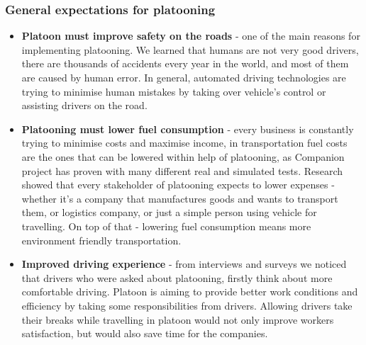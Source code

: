 \subsubsection{General expectations for platooning}
%
\begin{itemize}
    \item\textbf{Platoon must improve safety on the roads} - one of the main reasons for implementing platooning. We learned that humans are not very good drivers, there are thousands of accidents every year in the world, and most of them are caused by human error. In general, automated driving technologies are trying to minimise human mistakes by taking over vehicle's control or assisting drivers on the road.
    \item\textbf{Platooning must lower fuel consumption} - every business is constantly trying to minimise costs and maximise income, in transportation fuel costs are the ones that can be lowered within help of platooning, as Companion project has proven with many different real and simulated tests. Research showed that every stakeholder of platooning expects to lower expenses - whether it's a company that manufactures goods and wants to transport them, or logistics company, or just a simple person using vehicle for travelling. On top of that - lowering fuel consumption means more environment friendly transportation.
    \item\textbf{Improved driving experience} - from interviews and surveys we noticed that drivers who were asked about platooning, firstly think about more comfortable driving. Platoon is aiming to provide better work conditions and efficiency by taking some responsibilities from drivers. Allowing drivers take their breaks while travelling in platoon would not only improve workers satisfaction, but would also save time for the companies.
\end{itemize}
%
